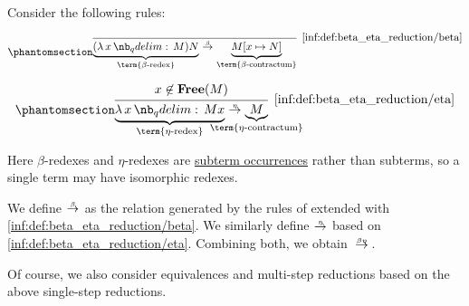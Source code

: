 \begin{definition}\label{def:beta_eta_reduction}
  Consider the following rules:
  \begin{paracol}{2}
    \begin{leftcolumn}
      \begin{equation*}\taglabel[\ensuremath{ \logic{Red}_\beta }]{inf:def:beta_eta_reduction/beta}
        \begin{prooftree}
          \infer0[\ref{inf:def:beta_eta_reduction/beta}]{ \underbrace{(\qabs x M) N}_{\T{\term{\( \beta \)-redex}}} \bred \underbrace{M[x \mapsto N]}_{\T{\term{\( \beta \)-contractum}}} },
        \end{prooftree}
      \end{equation*}
    \end{leftcolumn}

    \begin{rightcolumn}
      \begin{equation*}\taglabel[\ensuremath{ \logic{Red}_\eta }]{inf:def:beta_eta_reduction/eta}
        \begin{prooftree}
          \hypo{ x \not\in \op*{Free}(M) }
          \infer1[\ref{inf:def:beta_eta_reduction/eta}]{ \underbrace{\qabs x M x}_{\T{\term{\( \eta \)-redex}}} \ered \underbrace{M}_{\mathclap{\T{\term{\( \eta \)-contractum}}}} }.
        \end{prooftree}
      \end{equation*}
    \end{rightcolumn}
  \end{paracol}

  Here \( \beta \)-redexes and \( \eta \)-redexes are \hyperref[def:lambda_subterm_occurrence]{subterm occurrences} rather than subterms, so a single term may have isomorphic redexes.

  We define  \( {\bred} \) as the relation generated by the rules of  extended with \ref{inf:def:beta_eta_reduction/beta}. We similarly define  \( {\ered} \) based on \ref{inf:def:beta_eta_reduction/eta}. Combining both, we obtain  \( {\redrel{\beta\eta}} \).
\end{definition}
\begin{comments}
  \item Of course, we also consider equivalences and multi-step reductions based on the above single-step reductions.
\end{comments}

